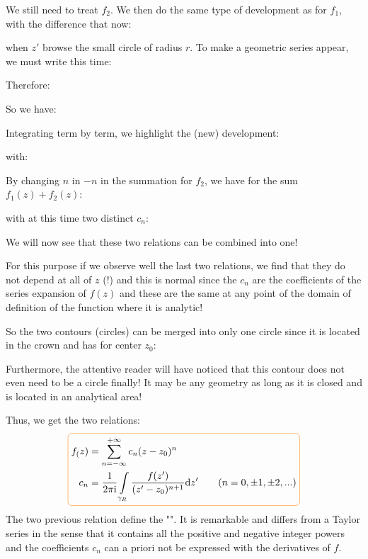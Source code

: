 	We still need to treat $f_2$. We then do the same type of development as for $f_1$, with the difference that now:
	
	when $z'$ browse the small circle of radius $r$. To make a geometric series appear, we must write this time:
	
	Therefore:
	
	So we have:
	
	Integrating term by term, we highlight the (new) development:
	
	with:
	
	By changing $n$ in $-n$ in the summation for $f_2$, we have for the sum $f_1(z)+f_2(z)$:
	
	with at this time two distinct $c_n$:
	
	We will now see that these two relations can be combined into one!
	
	For this purpose if we observe well the last two relations, we find that they do not depend at all of $z$ (!) and this is normal since the $c_n$ are the coefficients of the series expansion of $f(z)$ and these are the same at any point of the domain of definition of the function where it is analytic!
	
	So the two contours (circles) can be merged into only one circle since it is located in the crown and has for center $z_0$:
	
	Furthermore, the attentive reader will have noticed that this contour does not even need to be a circle finally! It may be any geometry as long as it is closed and is located in an analytical area!
	
	Thus, we get the two relations:
	\begin{equation}
  \addtolength{\fboxsep}{5pt}
   \boxed{
   \begin{gathered}
   		\begin{aligned}
		f_(z)&=\sum_{n=-\infty}^{+\infty} c_n(z-z_0)^n\\
		c_n&=\dfrac{1}{2\pi\mathrm{i}}\int\limits_{\gamma_R} \dfrac{f(z')}{(z'-z_0)^{n+1}}\mathrm{d}z' \qquad (n=0,\pm 1,\pm 2, ...)
   		\end{aligned}
   \end{gathered}
   }
	\end{equation}
	The two previous relation define the "". It is remarkable and differs from a Taylor series in the sense that it contains all the positive and negative integer powers and the coefficients $c_n$ can a priori not be expressed with the derivatives of $f$.
	
